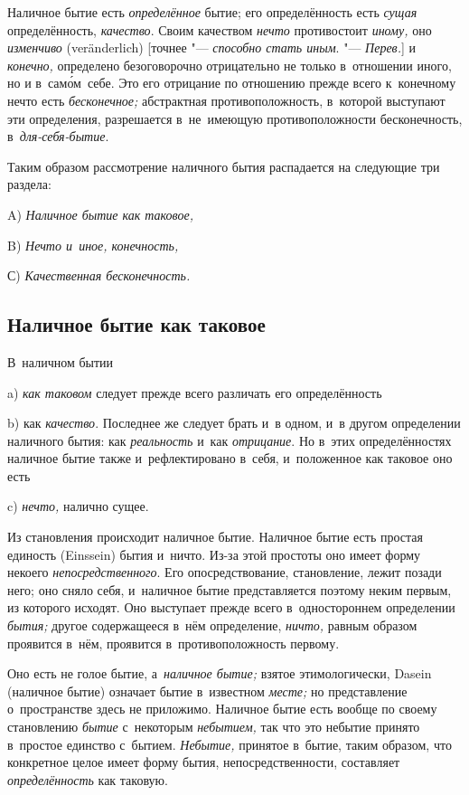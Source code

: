 Наличное бытие есть {\em определённое} бытие; его определённость есть
{\em сущая} определённость, {\em качество}. Своим качеством {\em нечто}
противостоит {\em иному,} оно {\em изменчиво} (ver\-änder\-lich)
[точнее "--- {\em способно стать иным}. "--- {\em Перев.}] и {\em конечно,}
определено безоговорочно отрицательно не только в~отношении иного, но и
в~сам\'{о}м~себе. Это его отрицание по отношению прежде всего к~конечному нечто
есть {\em бесконечное;} абстрактная противоположность, в~которой выступают эти
определения, разрешается в~не~имеющую противоположности бесконечность,
в~{\em для-себя-бытие}.

Таким образом рассмотрение наличного бытия
распадается на следующие три раздела:

A) {\em Наличное бытие как таковое,}

B) {\em Нечто и~иное, конечность,}

С) {\em Качественная бесконечность.}

\subsection{Наличное бытие как таковое}

В~наличном бытии

a) {\em как таковом} следует прежде всего различать его определённость

b) как {\em качество}. Последнее же следует брать и~в одном, и~в другом
определении наличного бытия: как {\em реальность} и~как {\em отрицание}.
Но в~этих определённостях наличное бытие также и~рефлектировано в~себя,
и~положенное как таковое оно есть

c) {\em нечто,} налично сущее.


Из становления происходит наличное бытие. Наличное бытие есть простая единость
(Eins\-sein) бытия и~ничто. Из-за этой простоты оно имеет форму некоего
{\em непосредственного}. Его опосредствование, становление, лежит позади него;
оно сняло себя, и~наличное бытие представляется поэтому неким первым, из
которого исходят. Оно выступает прежде всего в~одностороннем определении
{\em бытия;} другое содержащееся в~нём определение, {\em ничто,} равным
образом проявится в~нём, проявится в~противоположность первому.

Оно есть не голое бытие, а~{\em наличное бытие;} взятое этимологически, Dasein
(наличное бытие) означает бытие в~известном {\em месте;} но представление
о~пространстве здесь не приложимо. Наличное бытие есть вообще по своему
становлению {\em бытие} с~некоторым {\em небытием,} так что это небытие принято
в~простое единство с~бытием. {\em Небытие,} принятое в~бытие, таким образом,
что конкретное целое имеет форму бытия, непосредственности, составляет
{\em определённость} как таковую.

